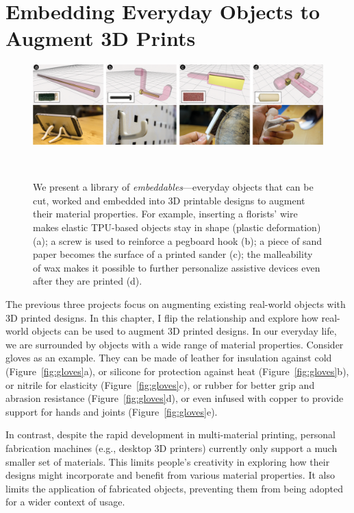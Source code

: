 \chapter{Embedding Everyday Objects to Augment 3D Prints}

\begin{figure} [h]
	\centering
   \includegraphics[width=1\textwidth]{figures/fig1}
   \caption{We present a library of \textit{embeddables}---everyday objects that can be cut, worked and embedded into 3D printable designs to augment their material properties. For example, inserting a florists' wire makes elastic TPU-based objects stay in shape (plastic deformation) (a); a screw is used to reinforce a pegboard hook (b); a piece of sand paper becomes the surface of a printed sander (c); the malleability of wax makes it possible to further personalize assistive devices even after they are printed (d).}~\label{fig:fig1}
\end{figure}


The previous three projects focus on augmenting existing real-world objects with 3D printed designs. In this chapter, I flip the relationship and explore how real-world objects can be used to augment 3D printed designs. %
In our everyday life, we are surrounded by objects with a wide range of material properties. Consider gloves as an example. They can be made of leather for insulation against cold (Figure~\ref{fig:gloves}a), or silicone for protection against heat (Figure~\ref{fig:gloves}b), or nitrile for elasticity (Figure~\ref{fig:gloves}c), or rubber for better grip and abrasion resistance (Figure~\ref{fig:gloves}d), or even infused with copper to provide support for hands and joints (Figure~\ref{fig:gloves}e).

In contrast, despite the rapid development in multi-material printing, personal fabrication machines (e.g., desktop 3D printers) currently only support a much smaller set of materials. This limits people's creativity in exploring how their designs might incorporate and benefit from various material properties. It also limits the application of fabricated objects, preventing them from being adopted for a wider context of usage.

